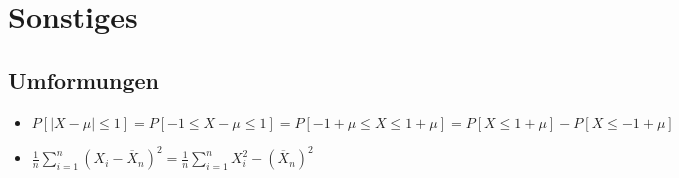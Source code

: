 
\section{Sonstiges}
\subsection{Umformungen}
\begin{itemize}
    \item $P[|X - \mu| \le 1] = P[-1 \le X - \mu \le 1] = P[-1 + \mu \le X \le 1 + \mu] = P[X \le 1 + \mu] - P[X \le -1 + \mu]$
    \item $\frac{1}{n} \sum_{i=1}^{n} (X_i - \overline X_n)^2 = \frac{1}{n} \sum_{i=1}^n X_i^2 - (\overline X_n)^2$
\end{itemize}

